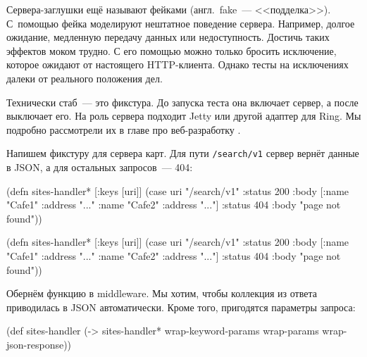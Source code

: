 
Сервера-заглушки ещё называют фейками (англ.~fake~--- <<подделка>>). С~помощью фейка
моделируют нештатное поведение сервера. Например, долгое ожидание, медленную
передачу данных или недоступность. Достичь таких эффектов моком трудно. С его
помощью можно только бросить исключение, которое ожидают от настоящего
HTTP-клиента. Однако тесты на исключениях далеки от реального положения дел.

Технически стаб~--- это фикстура. До запуска теста она включает сервер, а после
выключает его. На роль сервера подходит Jetty или другой адаптер для Ring. Мы
подробно рассмотрели их в главе про веб-разработку .

Напишем фикстуру для сервера карт. Для пути \verb|/search/v1| сервер вернёт
данные в JSON, а для остальных запросов~--- 404:

\label{sites-handler}

\ifx\DEVICETYPE\MOBILE

\begin{english}
  \begin{clojure}
(defn sites-handler* [{:keys [uri]}]
  (case uri
    "/search/v1"
    {:status 200
     :body [{:name "Cafe1"
             :address "..."}
            {:name "Cafe2"
             :address "..."}]}
    {:status 404
     :body "page not found"}))
  \end{clojure}
\end{english}

\else

\begin{english}
  \begin{clojure}
(defn sites-handler* [{:keys [uri]}]
  (case uri
    "/search/v1"
    {:status 200 :body [{:name "Cafe1" :address "..."}
                        {:name "Cafe2" :address "..."}]}
    {:status 404 :body "page not found"}))
  \end{clojure}
\end{english}

\fi


Обернём функцию в middleware. Мы хотим, чтобы коллекция из ответа приводилась в
JSON автоматически. Кроме того, пригодятся параметры запроса:

\begin{english}
  \begin{clojure}
(def sites-handler
  (-> sites-handler*
      wrap-keyword-params
      wrap-params
      wrap-json-response))
  \end{clojure}
\end{english}

